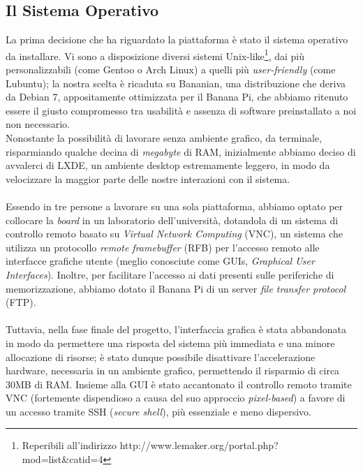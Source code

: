 \subsection{Il Sistema Operativo}
La prima decisione che ha riguardato la piattaforma è stato il sistema 
operativo da installare. Vi sono a disposizione diversi sistemi 
Unix-like\footnote{Reperibili all'indirizzo
http://www.lemaker.org/portal.php?mod=list\&catid=4}, 
dai più personalizzabili (come Gentoo o Arch Linux) a quelli più
 \emph{user-friendly} (come Lubuntu); la nostra scelta è ricaduta su Bananian, 
una distribuzione che deriva da Debian 7, appositamente ottimizzata per il 
Banana Pi, che abbiamo ritenuto essere il giusto compromesso tra usabilità
e assenza di software preinstallato a noi non necessario. \\
Nonostante la possibilità di lavorare senza ambiente grafico, da terminale, 
risparmiando qualche decina di \emph{megabyte} di RAM, inizialmente abbiamo 
deciso di avvalerci di LXDE, un ambiente desktop estremamente leggero, in modo 
da 
velocizzare la maggior parte delle nostre interazioni con il sistema.
\\ \\
Essendo in tre persone a lavorare su una sola piattaforma, abbiamo optato 
per collocare la \emph{board} in un laboratorio dell'università, dotandola
di un sistema di controllo remoto basato su \emph{Virtual Network Computing} 
(VNC), un sistema che utilizza un protocollo \emph{remote framebuffer} (RFB) 
per l'accesso remoto alle interfacce grafiche utente (meglio conosciute come 
GUIs, \emph{Graphical User Interfaces}). Inoltre, 
per facilitare l'accesso ai dati presenti sulle periferiche di memorizzazione, 
abbiamo dotato il Banana Pi di un server \emph{file transfer protocol} (FTP).
\\ \\
Tuttavia, nella fase finale del progetto, l'interfaccia grafica è stata 
abbandonata in modo da permettere una risposta del sistema più immediata e una 
minore allocazione di risorse; è stato dunque possibile disattivare 
l'accelerazione hardware, necessaria in un ambiente grafico, permettendo il 
risparmio di circa 30MB di RAM. Insieme alla GUI è stato accantonato il 
controllo remoto tramite VNC (fortemente dispendioso a causa del suo approccio 
\emph{pixel-based}) a favore di un accesso tramite SSH (\emph{secure shell}), 
più essenziale e meno dispersivo.
